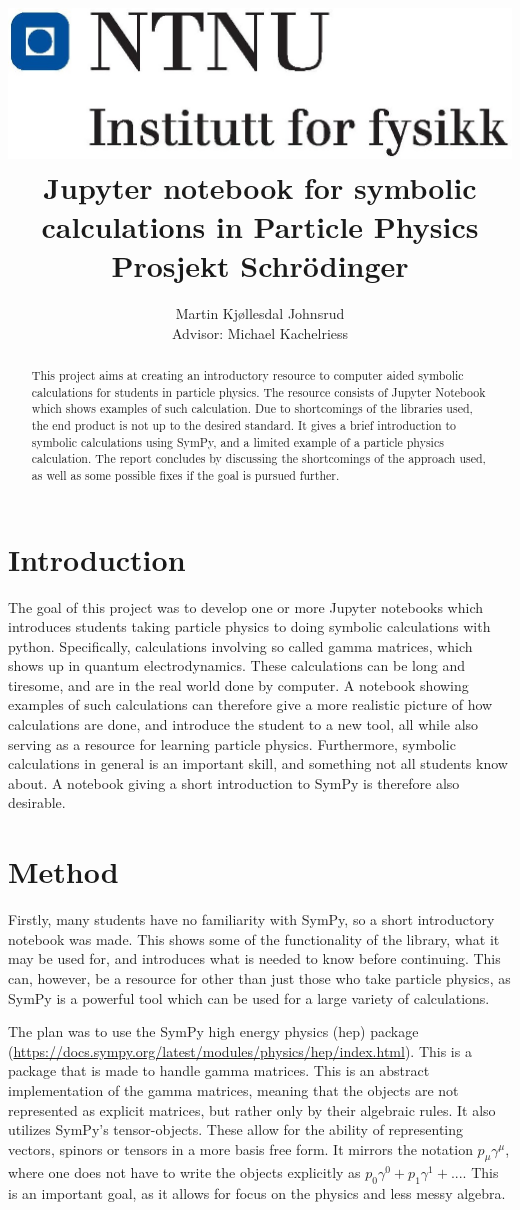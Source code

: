 \documentclass{article}
\title{
    \flushleft
    \includegraphics[width=.3\textwidth]{NTNU_logo.png}\\
    [1cm]
    \centering
    Jupyter notebook for symbolic calculations in Particle Physics
 \\
    \small{Prosjekt Schrödinger}
}
\author{
    Martin Kjøllesdal Johnsrud\\
    \small{Advisor: Michael Kachelriess}
    }
\begin{document}
    \maketitle
    \begin{abstract}
        This project aims at creating an introductory resource to computer aided symbolic calculations for students in particle physics. The resource consists of Jupyter Notebook which shows examples of such calculation. Due to shortcomings of the libraries used, the end product is not up to the desired standard. It gives a brief introduction to symbolic calculations using SymPy, and a limited example of a particle physics calculation. The report concludes by discussing the shortcomings of the approach used, as well as some possible fixes if the goal is pursued further.
    \end{abstract}

    \section*{Introduction}
    The goal of this project was to develop one or more Jupyter notebooks which introduces students taking particle physics to doing symbolic calculations with python. Specifically, calculations involving so called gamma matrices, which shows up in quantum electrodynamics. These calculations can be long and tiresome, and are in the real world done by computer. A notebook showing examples of such calculations can therefore give a more realistic picture of how calculations are done, and introduce the student to a new tool, all while also serving as a resource for learning particle physics. Furthermore, symbolic calculations in general is an important skill, and something not all students know about. A notebook giving a short introduction to SymPy is therefore also desirable.

    \section*{Method}
    Firstly, many students have no familiarity with SymPy, so a short introductory notebook was made. This shows some of the functionality of the library, what it may be used for, and introduces what is needed to know before continuing. This can, however, be a resource for other than just those who take particle physics, as SymPy is a powerful tool which can be used for a large variety of calculations.

    The plan was to use the SymPy high energy physics (hep) package (\url{https://docs.sympy.org/latest/modules/physics/hep/index.html}). This is a package that is made to handle gamma matrices. This is an abstract implementation of the gamma matrices, meaning that the objects are not represented as explicit matrices, but rather only by their algebraic rules. It also utilizes SymPy’s tensor-objects. These allow for the ability of representing vectors, spinors or tensors in a more basis free form. It mirrors the notation $p_\mu \gamma^\mu$, where one does not have to write the objects explicitly as $p_0 \gamma^0 + p_1 \gamma^1 +...$. This is an important goal, as it allows for focus on the physics and less messy algebra. 
    
\end{document}
